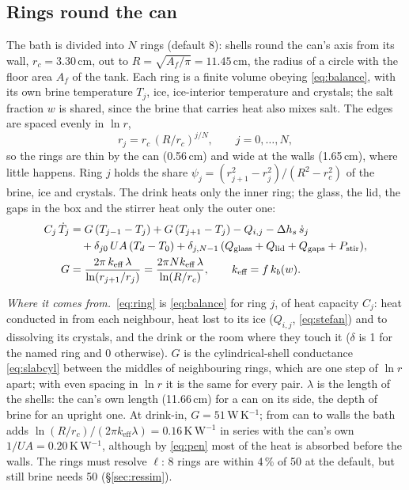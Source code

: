 \documentclass[11pt,a4paper]{article}
\newcommand{\where}{\par\noindent\textit{Where it comes from.}\ }
\begin{document}
\subsection{Rings round the can}
\label{sec:rings}
The bath is divided into $N$ rings (default 8): shells round the can's axis from its wall,
$r_c = 3.30$\,cm, out to $R = \sqrt{A_f/\pi} = 11.45$\,cm, the radius of a circle with the floor area
$A_f$ of the tank. Each ring is a finite volume obeying \eqref{eq:balance}, with its own brine
temperature $T_j$, ice, ice-interior temperature and crystals; the salt fraction $w$ is shared, since
the brine that carries heat also mixes salt. The edges are spaced evenly in $\ln r$,
\begin{equation}
r_j = r_c\,(R/r_c)^{j/N},\qquad j = 0,\dots,N,
\label{eq:rings}
\end{equation}
so the rings are thin by the can (0.56\,cm) and wide at the walls (1.65\,cm), where little happens.
Ring $j$ holds the share $\psi_j = (r_{j+1}^2 - r_j^2)/(R^2 - r_c^2)$ of the brine, ice and crystals. The
drink heats only the inner ring; the glass, the lid, the gaps in the box and the stirrer heat only the
outer one:
\begin{align}
C_j\,\dot T_j &= G\,(T_{j-1} - T_j) + G\,(T_{j+1} - T_j) - Q_{i,j} - \Delta h_s\,\dot s_j \notag\\
  &\quad + \delta_{j0}\,UA\,(T_d - T_0)
  + \delta_{j,N-1}\,(Q_{\text{glass}} + Q_{\text{lid}} + Q_{\text{gaps}} + P_{\text{stir}}),
  \label{eq:ring}\\
G &= \frac{2\pi\,k_{\text{eff}}\,\lambda}{\ln(r_{j+1}/r_j)} = \frac{2\pi N k_{\text{eff}}\,\lambda}{\ln(R/r_c)},
  \qquad k_{\text{eff}} = f\,k_b(w).
  \label{eq:G}
\end{align}
\where \eqref{eq:ring} is \eqref{eq:balance} for ring $j$, of heat capacity $C_j$: heat conducted in from
each neighbour, heat lost to its ice ($Q_{i,j}$, \eqref{eq:stefan}) and to dissolving its crystals, and the
drink or the room where they touch it ($\delta$ is 1 for the named ring and 0 otherwise). $G$ is the
cylindrical-shell conductance \eqref{eq:slabcyl} between the middles of neighbouring rings, which are
one step of $\ln r$ apart; with even spacing in $\ln r$ it is the same for every pair. $\lambda$ is the
length of the shells: the can's own length (11.66\,cm) for a can on its side, the depth of brine for an
upright one. At drink-in, $G = 51$\,W\,K$^{-1}$; from can to walls the bath adds
$\ln(R/r_c)/(2\pi k_{\text{eff}}\lambda) = 0.16$\,K\,W$^{-1}$ in series with the can's own
$1/UA = 0.20$\,K\,W$^{-1}$, although by \eqref{eq:pen} most of the heat is absorbed before the walls.
The rings must resolve $\ell$: 8 rings are within 4\,\% of 50 at the default, but still brine needs 50
(§\ref{sec:ressim}).
\end{document}
